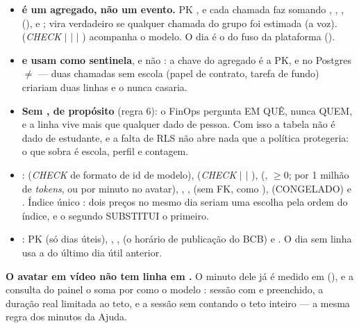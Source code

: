 \begin{itemize}
  \item \textbf{ é um agregado, não um evento.} PK
    , e cada chamada
    faz  somando ,
    , ,  (),
     e ;  vira verdadeiro se qualquer
    chamada do grupo foi estimada (a voz).  (\emph{CHECK}
     $|$  $|$  $|$ ) acompanha o
    modelo. O dia é o do fuso da plataforma ().
  \item \textbf{ e  usam  como sentinela},
    e não : a chave do agregado é a PK, e no Postgres
     $\neq$  --- duas chamadas sem escola (papel de contrato,
    tarefa de fundo) criariam duas linhas e o  nunca casaria.
  \item \textbf{Sem , de propósito} (regra 6): o FinOps
    pergunta EM QUÊ, nunca QUEM, e a linha vive mais que qualquer dado de
    pessoa. Com isso a tabela não é dado de estudante, e a falta de RLS não
    abre nada que a política protegeria: o que sobra é escola, perfil e
    contagem.
  \item \textbf{}:  (\emph{CHECK} de formato de id de
    modelo),  (\emph{CHECK}  $|$  $|$
    ),  (, $\ge 0$; por 1 milhão de
    \emph{tokens}, ou por minuto no avatar), ,
    ,  (sem FK, como ),
     (CONGELADO) e . Índice único
    : dois preços no mesmo dia seriam
    uma escolha pela ordem do índice, e o segundo SUBSTITUI o primeiro.
  \item \textbf{}: PK  (só dias úteis),
    , ,  (o horário de publicação do BCB)
    e . O dia sem linha usa a do último dia útil anterior.
\end{itemize}

\begin{nota}
\textbf{O avatar em vídeo não tem linha em .} O
minuto dele já é medido em  (), e a consulta
do painel o soma por  como o modelo : sessão
com  e  preenchido, a duração
real limitada ao teto, e a sessão sem  contando o teto inteiro --- a
mesma regra dos minutos da Ajuda.
\end{nota}

